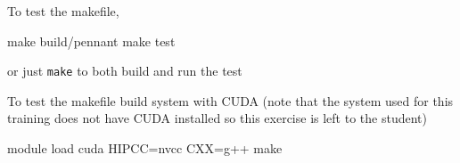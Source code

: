 \documentclass[
]{article}
\let\oldtexttt\texttt
\renewcommand{\texttt}[1]{
  \colorbox{Light}{\oldtexttt{#1}}
}
\newenvironment{Shaded}{}{}
\newcommand{\BuiltInTok}[1]{#1}
\newcommand{\ExtensionTok}[1]{#1}
\newcommand{\FunctionTok}[1]{\textcolor[rgb]{0.02,0.16,0.49}{#1}}
\newcommand{\NormalTok}[1]{#1}
\newcommand{\OperatorTok}[1]{\textcolor[rgb]{0.40,0.40,0.40}{#1}}
\newcommand{\VariableTok}[1]{\textcolor[rgb]{0.10,0.09,0.49}{#1}}
\begin{document}
\begin{Shaded}
\end{Shaded}

To test the makefile,

\begin{Shaded}
\begin{Highlighting}[]
\FunctionTok{make}\NormalTok{ build/pennant}
\FunctionTok{make}\NormalTok{ test}
\end{Highlighting}
\end{Shaded}

or just \texttt{make} to both build and run the test

To test the makefile build system with CUDA (note that the system used
for this training does not have CUDA installed so this exercise is left
to the student)

\begin{Shaded}
\begin{Highlighting}[]
\ExtensionTok{module}\NormalTok{ load cuda}
\VariableTok{HIPCC=}\NormalTok{nvcc }\VariableTok{CXX=}\NormalTok{g++ }\FunctionTok{make}
\end{Highlighting}
\end{Shaded}
\end{document}
